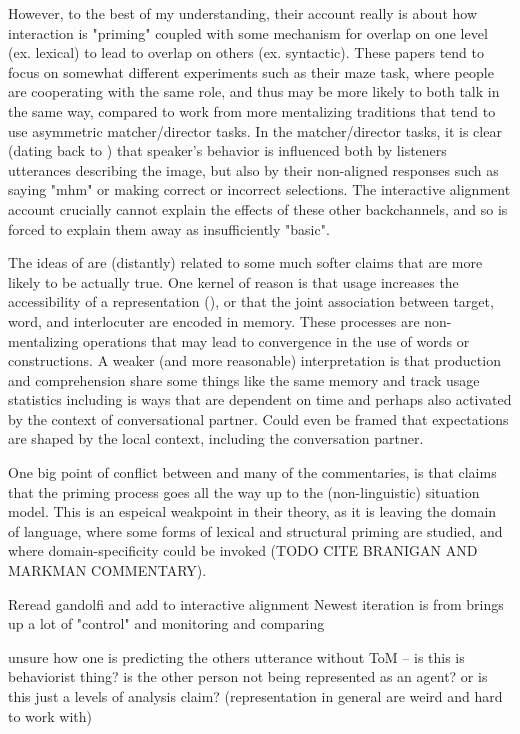 \documentclass[]{article}
\begin{document}
However, to the best of my understanding, their account really is about how interaction is "priming" coupled with some mechanism for overlap on one level (ex. lexical) to lead to overlap on others (ex. syntactic). These papers tend to focus on somewhat different experiments such as their maze task, where people are cooperating with the same role, and thus may be more likely to both talk in the same way, compared to work from more mentalizing traditions that tend to use asymmetric matcher/director tasks. In the matcher/director tasks, it is clear (dating back to \cite{krauss1966}) that speaker's behavior is influenced both by listeners utterances describing the image, but also by their non-aligned responses such as saying "mhm" or making correct or incorrect selections. The interactive alignment account crucially cannot explain the effects of these other backchannels, and so is forced to explain them away as insufficiently "basic". 


The ideas of \cite{pickering2004} are (distantly) related to some much softer claims that are more likely to be actually true. One kernel of reason is that usage increases the accessibility of a representation (\cite{macdonald1994}), or that the joint association between target, word, and interlocuter are encoded in memory. These processes are non-mentalizing operations that may lead to convergence in the use of words or constructions. A weaker (and more reasonable) interpretation is that production and comprehension share some things like the same memory and track usage statistics including is ways that are dependent on time and perhaps also activated by the context of conversational partner.  Could even be framed that expectations are shaped by the local context, including the conversation partner. 

One big point of conflict between \cite{pickering2004} and many of the commentaries, is that \cite{pickering2004} claims that the priming process goes all the way up to the (non-linguistic) situation model. This is an espeical weakpoint in their theory, as it is leaving the domain of language, where some forms of lexical and structural priming are studied, and where domain-specificity could be invoked (TODO CITE BRANIGAN AND MARKMAN COMMENTARY). 

Reread gandolfi and add to interactive alignment
Newest iteration is from \cite{gandolfi2022} brings up a lot of "control" and monitoring and comparing 

unsure how one is predicting the others utterance without ToM -- is this is behaviorist thing? is the other person not being represented as an agent? or is this just a levels of analysis claim? (representation in general are weird and hard to work with)
\end{document}
